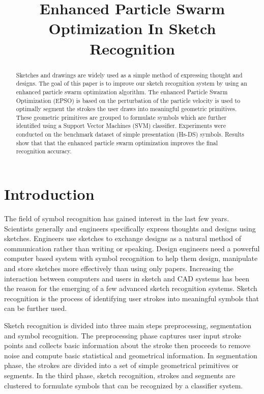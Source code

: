 \documentclass[10pt]{article}
\title{Enhanced Particle Swarm Optimization In Sketch Recognition}
\begin{document}
\maketitle
 \begin{abstract}

Sketches and drawings are widely used as a simple method of expressing thought and designs. The goal of this paper is to improve our sketch recognition system by using an enhanced particle swarm optimization algorithm. The enhanced Particle Swarm Optimization (EPSO) is based on the perturbation of the particle velocity is used to optimally segment the strokes the user draws into meaningful geometric primitives.  These geometric primitives are grouped to formulate symbols which are further identified using a Support Vector Machines (SVM) classifier. Experiments were conducted on the benchmark dataset of simple presentation (Hs-DS) symbols. Results show that that the enhanced particle swarm optimization improves the final recognition accuracy. 

\end{abstract}
 \section{Introduction}

The field of symbol recognition has gained interest in the last few years. Scientists generally and engineers specifically express thoughts and designs using sketches. Engineers use sketches to exchange designs as a natural method of communication rather than writing or speaking. Design engineers need a powerful computer based system with symbol recognition to help them design, manipulate and store sketches more effectively than using only papers. Increasing the interaction between computers and users in sketch and CAD systems has been the reason for the emerging of a few advanced sketch recognition systems. Sketch recognition is the process of identifying user strokes into meaningful symbols that can be further used.  

Sketch recognition is divided into three main steps preprocessing, segmentation and symbol recognition. The preprocessing phase captures user input stroke points and collects basic information about the stroke then proceeds to remove noise and compute basic statistical and geometrical information. In segmentation phase, the strokes are divided into a set of simple geometrical primitives or segments. In the third phase, sketch recognition, strokes and segments are clustered to formulate symbols that can be recognized by a classifier system.
\end{document}
